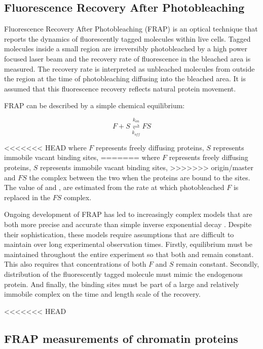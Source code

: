   \subsection{Fluorescence Recovery After Photobleaching}

    Fluorescence Recovery After Photobleaching (FRAP) is an optical technique
    that reports the dynamics of fluorescently tagged molecules within live cells.
    Tagged molecules inside a small region are irreversibly photobleached by
    a high power focused laser beam and the recovery rate of fluorescence
    in the bleached area is measured. The recovery rate is interpreted as unbleached molecules
    from outside the region at the time of photobleaching diffusing into the bleached area.
    It is assumed that this fluorescence recovery reflects natural protein movement.

    FRAP can be described by a simple chemical equilibrium:

    \begin{displaymath}
      F + S \overset{k_{on}}{\underset{k_{off}}{\rightleftharpoons}} FS
    \end{displaymath}

<<<<<<< HEAD
    where $F$ represents freely diffusing proteins, 
    $S$ represents immobile vacant binding sites, 
=======
    where $F$ represents freely diffusing proteins,
    $S$ represents immobile vacant binding sites,
>>>>>>> origin/master
    and $FS$ the complex between the two when the proteins are bound to the sites. 
    The value of \Kon{} and \Koff{},
    are estimated from the rate at which photobleached $F$ is replaced in the $FS$ complex.

    Ongoing development of FRAP has led to increasingly complex models
    that are both more precise and accurate than simple inverse exponential decay .
    Despite their sophistication, these models require assumptions
    that are difficult to maintain over long experimental observation times.
    Firstly, equilibrium must be maintained throughout the entire experiment 
    so that both \Kon{} and \Koff{} remain constant.
    This also requires that concentrations of both $F$ and $S$ remain constant.
    Secondly, distribution of the fluorescently tagged molecule must mimic the endogenous protein.
    And finally, the binding sites must be part of a large and relatively immobile complex
    on the time and length scale of the recovery.

<<<<<<< HEAD
  \subsection{FRAP measurements of chromatin proteins}

